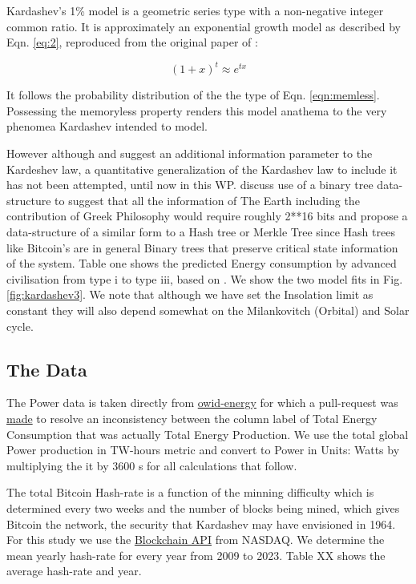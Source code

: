 \documentclass[final,5p,times,twocolumn,authoryear]{elsarticle}
\begin{document}
Kardashev's 1\% model is a geometric series type with a non-negative integer common ratio. It is approximately an exponential growth model as described by Eqn. \ref{eq:2}, reproduced from the original paper of \cite{kar64}:

\begin{equation}
(1+x)^t \approx e^{tx}
\label{eq:2}
\end{equation}

It follows the probability distribution of the the type of Eqn. \ref{eqn:memless}. Possessing the memoryless property renders this model anathema to the very phenomea Kardashev intended to model.

 However although \cite{sagan73} and \cite{kar64} suggest an additional information parameter to the Kardeshev law, a quantitative generalization of the Kardashev law to include it has not been attempted, until now in this WP.  \cite{sagan73} discuss use of a binary tree data-structure to suggest that all the information of The Earth including the contribution of Greek Philosophy would require roughly 2**16 bits and propose a data-structure of a similar form to a Hash tree or Merkle Tree since Hash trees like Bitcoin's are in general Binary trees that preserve critical state information of the system. Table one shows the predicted Energy consumption by advanced civilisation from type i to type iii, based on \cite{kar64}. We show the two model fits in Fig. \ref{fig:kardashev3}. We note that although we have set the Insolation limit as constant they will also depend somewhat on the Milankovitch (Orbital) and Solar cycle. 

\subsection{The Data}
\label{subsec: data}

The Power data is taken directly from \href{https://github.com/owid/energy-data}{owid-energy} for which a pull-request was \href{https://github.com/owid/energy-data/pull/23}{made} to resolve an inconsistency between the column label of Total Energy Consumption that was actually Total Energy Production. We use the total global Power production in TW-hours metric and convert to Power in Units: Watts by multiplying the it by 3600 s for all calculations that follow.

The total Bitcoin Hash-rate is a function of the minning difficulty which is determined every two weeks and the number of blocks being mined, which gives Bitcoin the network, the security that Kardashev may have envisioned in 1964. For this study we use the \href{https://data.nasdaq.com/data/BCHAIN/HRATE-bitcoin-hash-rate}{Blockchain API} from NASDAQ. We determine the mean yearly hash-rate for every year from 2009 to 2023. Table XX shows the average hash-rate and year. 
\end{document}
